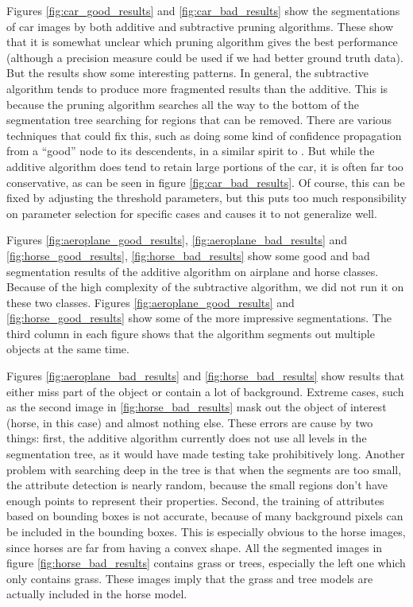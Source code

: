 \documentclass[10pt,twocolumn,letterpaper]{article}
\begin{document}
Figures \ref{fig:car_good_results} and \ref{fig:car_bad_results} show the
segmentations of car images by both additive and subtractive pruning
algorithms. These show that it is somewhat unclear which pruning algorithm
gives the best performance (although a precision measure could be used if we
had better ground truth data).  But the results show some interesting patterns.
In general, the subtractive algorithm tends to produce more fragmented results
than the additive.  This is because the pruning algorithm searches all the way
to the bottom of the segmentation tree searching for regions that can be removed.
There are various techniques that could fix this, such as doing some kind of
confidence propagation from a ``good'' node to its descendents, in a similar
spirit to \cite{borenstein04}.  But while the additive algorithm does tend
to retain large portions of the car, it is often far too conservative, as
can be seen in figure \ref{fig:car_bad_results}.  Of course, this can be 
fixed by adjusting the threshold parameters, but this puts too much responsibility
on parameter selection for specific cases and causes it to not generalize well.

Figures \ref{fig:aeroplane_good_results}, \ref{fig:aeroplane_bad_results} and 
\ref{fig:horse_good_results}, \ref{fig:horse_bad_results} show some good and bad 
segmentation results of the additive algorithm on airplane and horse classes. Because of the
high complexity of the subtractive algorithm, we did not run it on these two classes. 
Figures \ref{fig:aeroplane_good_results} and \ref{fig:horse_good_results} show some
of the more impressive segmentations.  The third column in each figure shows that
the algorithm segments out multiple objects at the same time.

Figures \ref{fig:aeroplane_bad_results} and \ref{fig:horse_bad_results} show results
that either miss part of the object or contain a lot of background.  Extreme cases,
such as the second image in \ref{fig:horse_bad_results} mask out the object of interest
(horse, in this case) and almost nothing else.  These errors are cause by two things:
first, the additive algorithm currently does not use all levels in the segmentation tree,
as it would have made testing take prohibitively long.
Another problem with searching deep in the tree is that when the segments are too small, 
the attribute detection is nearly random, because the small regions 
don't have enough points to represent their properties. Second, the training of attributes based on
bounding boxes is not accurate, because of many background pixels can be included in the bounding boxes. 
This is especially obvious to the horse images, since horses are far from having a convex shape. 
All the segmented images in figure \ref{fig:horse_bad_results} contains grass or trees, especially the 
left one which only contains grass. These images imply that the grass and tree models are actually
included in the horse model.\\  
\end{document}
